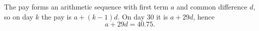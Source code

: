 The pay forms an arithmetic sequence with first term $a$ and common difference $d$, so on day $k$ the pay is $a+(k-1)d$. On day $30$ it is $a+29d$, hence
\[
\boxed{a+29d=40.75}.
\]
